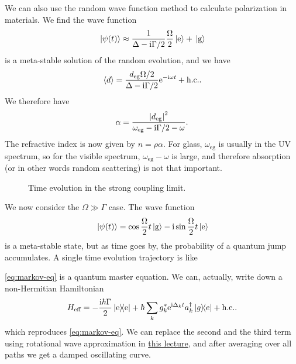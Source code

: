 \documentclass[hyperref, a4paper]{article}
\newcommand*{\ii}{\mathrm{i}}
\newcommand*{\ee}{\mathrm{e}}
\begin{document}
We can also use the random wave function method to calculate polarization in materials.
We find the wave function
\begin{equation}
    \ket*{\psi(t)} \approx \frac{1}{\Delta - \ii \Gamma / 2} \frac{\Omega}{2} \ket*{\text{e}} + \ket*{\text{g}}
\end{equation}
is a meta-stable solution of the random evolution, and we have 
\begin{equation}
    \expval*{d} = \frac{d_\text{eg} \Omega / 2}{\Delta - \ii \Gamma / 2} \ee^{- \ii \omega t} + \text{h.c.}.
\end{equation}
We therefore have 
\begin{equation}
    \alpha = \frac{\abs{d_\text{eg}}^2}{\omega_\text{eg} - \ii \Gamma / 2 - \omega}.
    \label{eq:polarization}
\end{equation}
The refractive index is now given by $n = \rho \alpha$. For glass, $\omega_\text{eg}$ is usually in the UV 
spectrum, so for the visible spectrum, $\omega_\text{eg} - \omega$ is large, and therefore absorption 
(or in other words random scattering) is not that important.

\begin{figure}
    \centering
    
    \caption{Time evolution in the strong coupling limit.}
\end{figure}

We now consider the $\Omega \gg \Gamma$ case. The wave function 
\begin{equation}
    \ket*{\psi(t)} = \cos \frac{\Omega}{2} t \ket*{\text{g}} - \ii \sin \frac{\Omega}{2} t \ket*{\text{e}}
\end{equation}
is a meta-stable state, but as time goes by, the probability of a quantum jump accumulates. 
A single time evolution trajectory is like 

\eqref{eq:markov-eq} is a quantum master equation. We can, actually, write down a non-Hermitian Hamiltonian
\begin{equation}
    H_\text{eff} = - \frac{\ii \hbar \Gamma}{2} \dyad{\text{e}} 
    + \hbar \sum_{k} g_k^* \ee^{ \ii \Delta_k t} a_k^\dagger \dyad{g}{e} + \text{h.c.}.
\end{equation}
which reproduces \eqref{eq:markov-eq}. We can replace the second and the third term using rotational 
wave approximation in \href{10-28.pdf}{this lecture}, and after averaging over all paths we get a 
damped oscillating curve.
\end{document}
